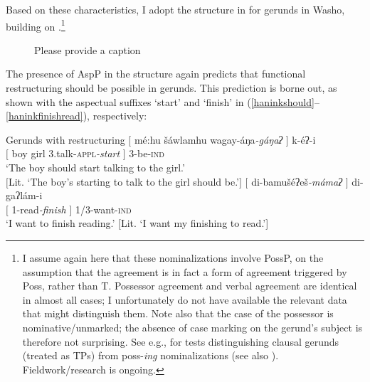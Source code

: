 \documentclass[output=paper]{langscibook}
\begin{document}
Based on these characteristics, I adopt the structure in  for gerunds in Washo, building on \citet{kratzer1996}.\footnote{I assume again here that these nominalizations involve PossP, on the assumption that the agreement is in fact a form of agreement triggered by Poss, rather than T. Possessor agreement and verbal agreement are identical in almost all cases; I unfortunately do not have available the relevant data that might distinguish them. Note also that the case of the possessor is nominative/unmarked; the absence of case marking on the gerund's subject is therefore not surprising. See e.g., \citet{pires2007} for tests distinguishing clausal gerunds (treated as TPs) from poss-{\itshape ing} nominalizations (see also \citealt{chomsky1970,abney1987}). Fieldwork/research is ongoing.} 

\begin{figure}
\caption{\color{red}Please provide a caption\label{fig:haninkgerundstructure}}
\end{figure}

The presence of AspP in the structure again predicts that functional restructuring should be possible in gerunds. This prediction is borne out, as shown with the aspectual suffixes `start' and `finish' in (\ref{haninkshould}--\ref{haninkfinishread}), respectively:


\ea Gerunds with restructuring \label{haninkgerundr}
\ea\gll $[$ mé:hu šáwlamhu wagay-áŋa\textit{-gáŋaʔ} $]$ k-éʔ-i\\ 
$[$ boy girl 3.talk-{\scshape appl}{\itshape-start} $]$ 3-be-{\scshape ind}\\
\glt `The boy should start talking to the girl.'\\$[$Lit. `The boy's starting to talk to the girl should be.'$]$ \label{haninkshould}
\ex \label{haninkfinishread}
\gll $[$ di-bamušéʔeš\textit{-mámaʔ} $]$  di-gaʔlám-i\\
$[$ 1-read\textit{-finish} $]$ 1/3-want-{\scshape ind}\\
\glt `I want to finish reading.' [Lit. `I want my finishing to read.']
\z
\z 
\end{document}
